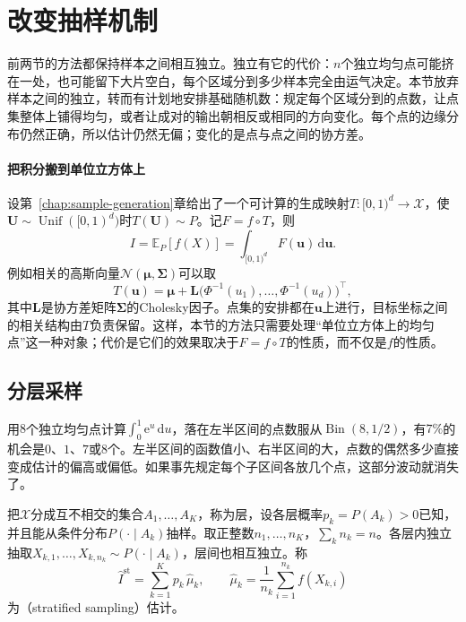 \section{改变抽样机制}
\label{sec:vr-change-mechanism}

前两节的方法都保持样本之间相互独立。独立有它的代价：$n$个独立均匀点可能挤在一处，也可能留下大片空白，每个区域分到多少样本完全由运气决定。本节放弃样本之间的独立，转而有计划地安排基础随机数：规定每个区域分到的点数，让点集整体上铺得均匀，或者让成对的输出朝相反或相同的方向变化。每个点的边缘分布仍然正确，所以估计仍然无偏；变化的是点与点之间的协方差。

\paragraph{把积分搬到单位立方体上}
设第~\ref{chap:sample-generation}章给出了一个可计算的生成映射$T:[0,1)^d\to\mathcal{X}$，使$\bm{U}\sim\operatorname{Unif}([0,1)^d)$时$T(\bm{U})\sim P$。记$F=f\circ T$，则
\begin{equation}
 I=\mathbb{E}_P[f(X)]=\int_{[0,1)^d}F(\bm{u})\,\mathrm{d}\bm{u} .
 \label{eq:vr-unit-cube}
\end{equation}
例如相关的高斯向量$\mathcal{N}(\bm{\mu},\bm{\Sigma})$可以取
\[
 T(\bm{u})=\bm{\mu}+\bm{L}\bigl(\Phi^{-1}(u_1),\dots,\Phi^{-1}(u_d)\bigr)^{\top} ,
\]
其中$\bm{L}$是协方差矩阵$\bm{\Sigma}$的Cholesky因子。点集的安排都在$\bm{u}$上进行，目标坐标之间的相关结构由$T$负责保留。这样，本节的方法只需要处理“单位立方体上的均匀点”这一种对象；代价是它们的效果取决于$F=f\circ T$的性质，而不仅是$f$的性质。

\subsection{分层采样}
\label{sec:vr-stratified}

用$8$个独立均匀点计算$\int_0^1\mathrm{e}^{u}\,\mathrm{d}u$，落在左半区间的点数服从$\operatorname{Bin}(8,1/2)$，有$7\%$的机会是$0$、$1$、$7$或$8$个。左半区间的函数值小、右半区间的大，点数的偶然多少直接变成估计的偏高或偏低。如果事先规定每个子区间各放几个点，这部分波动就消失了。

\begin{definition}[分层采样估计]
\label{def:vr-stratified}
把$\mathcal{X}$分成互不相交的集合$A_1,\dots,A_K$，称为层，设各层概率$p_k=P(A_k)>0$已知，并且能从条件分布$P(\cdot\mid A_k)$抽样。取正整数$n_1,\dots,n_K$，$\sum_kn_k=n$。各层内独立抽取$X_{k,1},\dots,X_{k,n_k}\sim P(\cdot\mid A_k)$，层间也相互独立。称
\begin{equation}
 \hat{I}^{\mathrm{st}}=\sum_{k=1}^{K}p_k\,\hat{\mu}_k,\qquad \hat{\mu}_k=\frac{1}{n_k}\sum_{i=1}^{n_k}f(X_{k,i})
 \label{eq:vr-stratified}
\end{equation}
为（stratified sampling）估计。
\end{definition}

